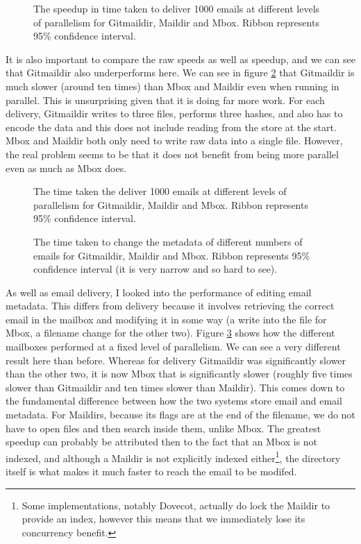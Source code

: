 \begin{figure}[h]
    \centering
    
    \caption{The speedup in time taken to deliver 1000 emails at different levels of parallelism for Gitmaildir, Maildir and Mbox. Ribbon represents 95\% confidence interval.}
    \label{fig:tdpp_speedup_combined}
\end{figure}

It is also important to compare the raw speeds as well as speedup, and we can see that Gitmaildir also underperforms here. We can see in figure \ref{fig:tdpp_combined} that Gitmaildir is much slower (around ten times) than Mbox and Maildir even when running in parallel. This is unsurprising given that it is doing far more work. For each delivery, Gitmaildir writes to three files, performs three hashes, and also has to encode the data and this does not include reading from the store at the start. Mbox and Maildir both only need to write raw data into a single file. However, the real problem seems to be that it does not benefit from being more parallel even as much as Mbox does.

\begin{figure}[h]
    \centering
    
    \caption{The time taken the deliver 1000 emails at different levels of parallelism for Gitmaildir, Maildir and Mbox. Ribbon represents 95\% confidence interval.}
    \label{fig:tdpp_combined}
\end{figure}

\begin{figure}[h]
    \centering
    
  \caption{The time taken to change the metadata of different numbers of emails for Gitmaildir, Maildir and Mbox. Ribbon represents 95\% confidence interval (it is very narrow and so hard to see).}
    \label{fig:tmp_combined}
\end{figure}

As well as email delivery, I looked into the performance of editing email metadata. This differs from delivery because it involves retrieving the correct email in the mailbox and modifying it in some way (a write into the file for Mbox, a filename change for the other two). Figure \ref{fig:tmp_combined} shows how the different mailboxes performed at a fixed level of parallelism. We can see a very different result here than before. Whereas for delivery Gitmaildir was significantly slower than the other two, it is now Mbox that is significantly slower (roughly five times slower than Gitmaildir and ten times slower than Maildir). This comes down to the fundamental difference between how the two systems store email and email metadata. For Maildirs, because its flags are at the end of the filename, we do not have to open files and then search inside them, unlike Mbox. The greatest speedup can probably be attributed then to the fact that an Mbox is not indexed, and although a Maildir is not explicitly indexed either\footnote{Some implementations, notably Dovecot\cite{dovecot_maildir}, actually do lock the Maildir to provide an index, however this means that we immediately lose its concurrency benefit.}, the directory itself is what makes it much faster to reach the email to be modifed.


